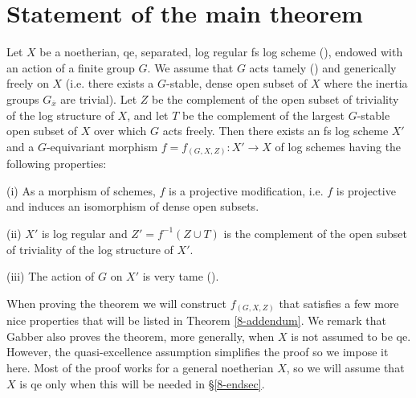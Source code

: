 \documentclass[10pt]{../fichiers-configuration-latex/smfart}
\begin{document}
\section{Statement of the main theorem}\label{8-mainsec}
\begin{theorem}[Gabber]\label{8-TH. MODIFICATION} Let $X$ be a
noetherian, qe, separated, log regular fs log scheme (),
endowed with an action of a finite group $G$. We assume that $G$
acts tamely () and generically freely on $X$
(i.e. there exists a $G$-stable, dense open subset of $X$ where
the inertia groups $G_{\overline{x}}$ are trivial). Let $Z$ be the
complement of the open subset of triviality of the log structure of
$X$, and let $T$ be the complement of the largest $G$-stable open
subset of $X$ over which $G$ acts freely. Then there exists an fs log
scheme $X'$ and a  $G$-equivariant morphism $f=f_{(G,X,Z)}{\colon}
X' \to X$ of log schemes having the following properties:

(i) As a morphism of schemes, $f$ is a projective modification,
i.e. $f$ is projective and induces an isomorphism of dense open
subsets.

(ii) $X'$ is log regular and $Z' = f^{-1}(Z \cup T)$ is the
complement of the open subset of triviality of the log structure
of $X'$.

(iii) The action of $G$ on $X'$ is very tame ().
\end{theorem}

When proving the theorem we will construct $f_{(G,X,Z)}$ that
satisfies a few more nice properties that will be listed in Theorem
\ref{8-addendum}. We remark that Gabber also proves the theorem, 
more generally, when $X$ is not assumed to be qe. However, 
the quasi-excellence assumption simplifies the proof so we impose it here.
Most of the proof works for a general noetherian $X$, so we will assume 
that $X$ is qe only when this will be needed in \S\ref{8-endsec}.
\end{document}
